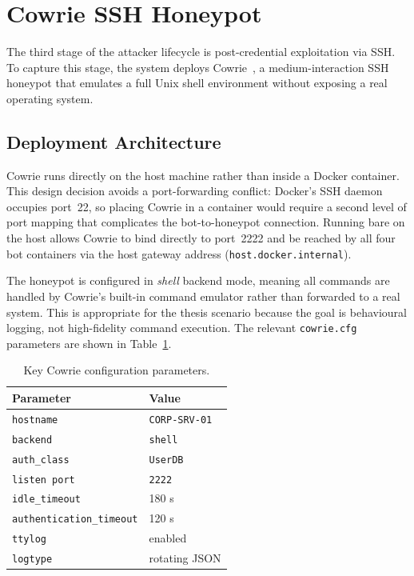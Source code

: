 
\section{Cowrie SSH Honeypot}
\label{sec:cowrie}

The third stage of the attacker lifecycle is post-credential exploitation via
SSH\@. To capture this stage, the system deploys Cowrie~\cite{Son05}, a
medium-interaction SSH honeypot that emulates a full Unix shell environment
without exposing a real operating system.

\subsection{Deployment Architecture}

Cowrie runs directly on the host machine rather than inside a Docker container.
This design decision avoids a port-forwarding conflict: Docker's SSH daemon
occupies port~22, so placing Cowrie in a container would require a second level
of port mapping that complicates the bot-to-honeypot connection. Running bare on
the host allows Cowrie to bind directly to port~2222 and be reached by all four
bot containers via the host gateway address (\texttt{host.docker.internal}).

The honeypot is configured in \emph{shell} backend mode, meaning all commands
are handled by Cowrie's built-in command emulator rather than forwarded to a
real system. This is appropriate for the thesis scenario because the goal is
behavioural logging, not high-fidelity command execution. The relevant
\texttt{cowrie.cfg} parameters are shown in Table~\ref{tab:cowrie_cfg}.

\begin{table}[h]
\centering
\caption{Key Cowrie configuration parameters.}
\label{tab:cowrie_cfg}
\begin{tabular}{ll}
\hline
\textbf{Parameter} & \textbf{Value} \\
\hline
\texttt{hostname}              & \texttt{CORP-SRV-01} \\
\texttt{backend}               & \texttt{shell} \\
\texttt{auth\_class}           & \texttt{UserDB} \\
\texttt{listen port}           & \texttt{2222} \\
\texttt{idle\_timeout}         & 180 s \\
\texttt{authentication\_timeout} & 120 s \\
\texttt{ttylog}                & enabled \\
\texttt{logtype}               & rotating JSON \\
\hline
\end{tabular}
\end{table}


